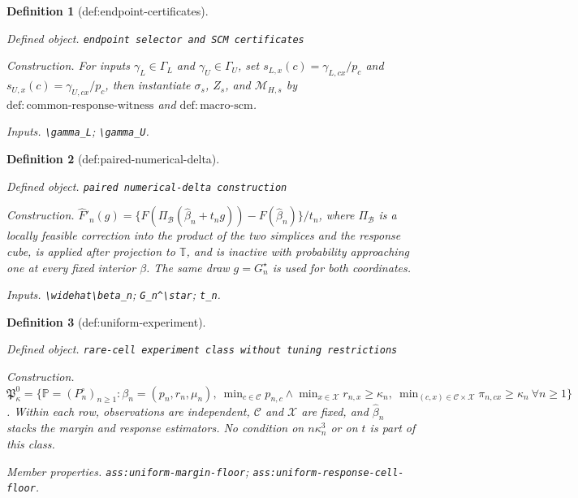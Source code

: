 \documentclass{article}
\newtheorem{definition}{Definition}
\begin{document}
\begin{definition}[def:endpoint-certificates]\label{def:endpoint-certificates}
\par\smallskip\noindent\emph{Defined object.} \texttt{endpoint selector and SCM certificates}
\par\smallskip\noindent\emph{Construction.} For inputs \(\gamma_L\in\Gamma_L\) and \(\gamma_U\in\Gamma_U\), set \(s_{L,x}(c)=\gamma_{L,cx}/p_c\) and \(s_{U,x}(c)=\gamma_{U,cx}/p_c\), then instantiate \(\sigma_s\), \(Z_s\), and \(\mathcal M_{H,s}\) by \(\mathrm{def:common\text{-}response\text{-}witness}\) and \(\mathrm{def:macro\text{-}scm}\).
\par\smallskip\noindent\emph{Inputs.} \texttt{\textbackslash{}\allowbreak{}gamma\_\allowbreak{}L}; \texttt{\textbackslash{}\allowbreak{}gamma\_\allowbreak{}U}.
\end{definition}

\begin{definition}[def:paired-numerical-delta]\label{def:paired-numerical-delta}
\par\smallskip\noindent\emph{Defined object.} \texttt{paired numerical-\allowbreak{}delta construction}
\par\smallskip\noindent\emph{Construction.} \(\widehat F'_n(g)=\{F(\Pi_{\mathcal B}(\widehat\beta_n+t_ng))-F(\widehat\beta_n)\}/t_n\), where \(\Pi_{\mathcal B}\) is a locally feasible correction into the product of the two simplices and the response cube, is applied after projection to \(\mathbb T\), and is inactive with probability approaching one at every fixed interior \(\beta\). The same draw \(g=G_n^\star\) is used for both coordinates.
\par\smallskip\noindent\emph{Inputs.} \texttt{\textbackslash{}\allowbreak{}widehat\textbackslash{}\allowbreak{}beta\_\allowbreak{}n}; \texttt{G\_\allowbreak{}n\textasciicircum{}\textbackslash{}\allowbreak{}star}; \texttt{t\_\allowbreak{}n}.
\end{definition}

\begin{definition}[def:uniform-experiment]\label{def:uniform-experiment}
\par\smallskip\noindent\emph{Defined object.} \texttt{rare-\allowbreak{}cell experiment class without tuning restrictions}
\par\smallskip\noindent\emph{Construction.} \(\mathfrak P_{\kappa}^{0}=\{\mathbb P=(P_n^\circ)_{n\ge1}:\beta_n=(p_n,r_n,\mu_n),\ \min_{c\in\mathcal C}p_{n,c}\wedge\min_{x\in\mathcal X}r_{n,x}\ge\kappa_n,\ \min_{(c,x)\in\mathcal C\times\mathcal X}\pi_{n,cx}\ge\kappa_n\ \forall n\ge1\}\). Within each row, observations are independent, \(\mathcal C\) and \(\mathcal X\) are fixed, and \(\widehat\beta_n\) stacks the margin and response estimators. No condition on \(n\kappa_n^3\) or on \(t\) is part of this class.
\par\smallskip\noindent\emph{Member properties.} \texttt{ass:\allowbreak{}uniform-\allowbreak{}margin-\allowbreak{}floor}; \texttt{ass:\allowbreak{}uniform-\allowbreak{}response-\allowbreak{}cell-\allowbreak{}floor}.
\end{definition}
\end{document}

